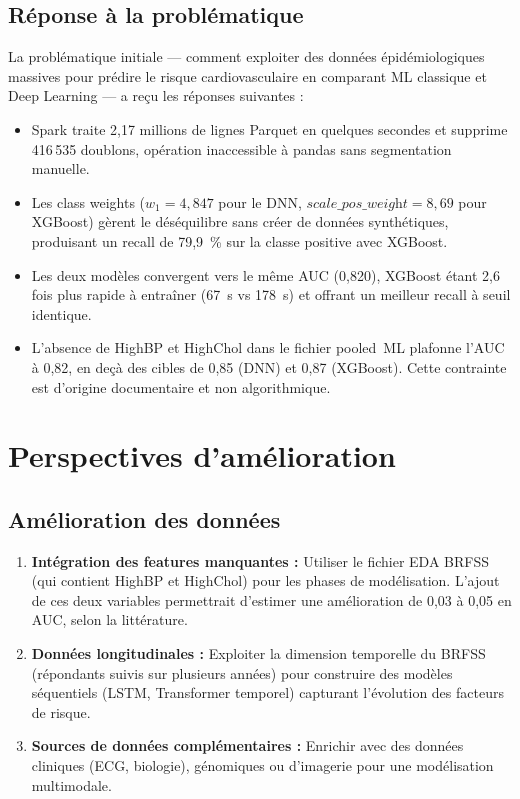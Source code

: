 \subsection{Réponse à la problématique}

La problématique initiale — comment exploiter des données épidémiologiques massives pour prédire le risque cardiovasculaire en comparant ML classique et Deep Learning — a reçu les réponses suivantes :

\begin{itemize}
    \item Spark traite 2,17 millions de lignes Parquet en quelques secondes et supprime
          416\,535 doublons, opération inaccessible à pandas sans segmentation manuelle.
    \item Les class weights ($w_1 = 4{,}847$ pour le DNN, $\textit{scale\_pos\_weight} = 8{,}69$
          pour XGBoost) gèrent le déséquilibre sans créer de données synthétiques,
          produisant un recall de 79,9~\% sur la classe positive avec XGBoost.
    \item Les deux modèles convergent vers le même AUC (0,820), XGBoost étant
          2,6 fois plus rapide à entraîner (67~s vs 178~s) et offrant un meilleur
          recall à seuil identique.
    \item L'absence de HighBP et HighChol dans le fichier pooled~ML plafonne l'AUC
          à 0,82, en deçà des cibles de 0,85 (DNN) et 0,87 (XGBoost).
          Cette contrainte est d'origine documentaire et non algorithmique.
\end{itemize}

\section{Perspectives d'amélioration}

\subsection{Amélioration des données}

\begin{enumerate}
    \item \textbf{Intégration des features manquantes :} Utiliser le fichier EDA BRFSS (qui contient HighBP et HighChol) pour les phases de modélisation. L'ajout de ces deux variables permettrait d'estimer une amélioration de 0,03 à 0,05 en AUC, selon la littérature.

    \item \textbf{Données longitudinales :} Exploiter la dimension temporelle du BRFSS (répondants suivis sur plusieurs années) pour construire des modèles séquentiels (LSTM, Transformer temporel) capturant l'évolution des facteurs de risque.

    \item \textbf{Sources de données complémentaires :} Enrichir avec des données cliniques (ECG, biologie), génomiques ou d'imagerie pour une modélisation multimodale.
\end{enumerate}

